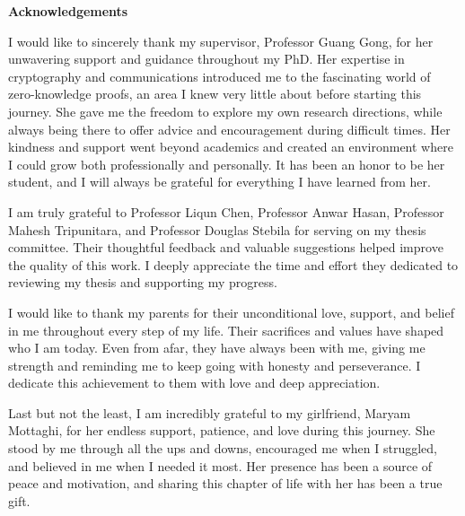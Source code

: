 





\cleardoublepage
{}    %

\begin{center}\textbf{Acknowledgements}\end{center}

I would like to sincerely thank my supervisor, Professor Guang Gong, for her unwavering support and guidance throughout my PhD. Her expertise in cryptography and communications introduced me to the fascinating world of zero-knowledge proofs, an area I knew very little about before starting this journey. She gave me the freedom to explore my own research directions, while always being there to offer advice and encouragement during difficult times. Her kindness and support went beyond academics and created an environment where I could grow both professionally and personally. It has been an honor to be her student, and I will always be grateful for everything I have learned from her.

I am truly grateful to Professor Liqun Chen, Professor Anwar Hasan, Professor Mahesh Tripunitara, and Professor Douglas Stebila for serving on my thesis committee. Their thoughtful feedback and valuable suggestions helped improve the quality of this work. I deeply appreciate the time and effort they dedicated to reviewing my thesis and supporting my progress.

I would like to thank my parents for their unconditional love, support, and belief in me throughout every step of my life. Their sacrifices and values have shaped who I am today. Even from afar, they have always been with me, giving me strength and reminding me to keep going with honesty and perseverance. I dedicate this achievement to them with love and deep appreciation.

Last but not the least, I am incredibly grateful to my girlfriend, Maryam Mottaghi, for her endless support, patience, and love during this journey. She stood by me through all the ups and downs, encouraged me when I struggled, and believed in me when I needed it most. Her presence has been a source of peace and motivation, and sharing this chapter of life with her has been a true gift.

\cleardoublepage
{}    %

